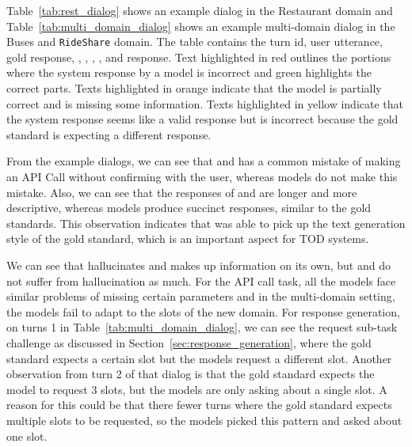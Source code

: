 
Table~\ref{tab:rest_dialog} shows an example dialog in the Restaurant domain and Table~\ref{tab:multi_domain_dialog} shows an example multi-domain dialog in the Buses and \texttt{RideShare} domain. The table contains the turn id, user utterance, gold response, {\gptt}, {\gptf}, {\gpt}, {\flan}, and {\opt} response. Text highlighted in red outlines the portions where the system response by a model is incorrect and green highlights the correct parts. Texts highlighted in orange indicate that the model is partially correct and is missing some information. Texts highlighted in yellow indicate that the system response seems like a valid response but is incorrect because the gold standard is expecting a different response. 

From the example dialogs, we can see that {\gptt} and {\gptf} has a common mistake of making an API Call without confirming with the user, whereas {\oursys} models do not make this mistake. Also, we can see that the responses of {\gptt} and {\gptf} are longer and more descriptive, whereas {\oursys} models produce succinct responses, similar to the gold standards. This observation indicates that {\oursys} was able to pick up the text generation style of the gold standard, which is an important aspect for TOD systems.

We can see that {\gpt} hallucinates and makes up information on its own, but {\flan} and {\opt} do not suffer from hallucination as much. For the API call task, all the models face similar problems of missing certain parameters and in the multi-domain setting, the models fail to adapt to the slots of the new domain. For response generation, on turns 1 in Table~\ref{tab:multi_domain_dialog}, we can see the request sub-task challenge as discussed in Section~\ref{sec:response_generation}, where the gold standard expects a certain slot but the models request a different slot. Another observation from turn 2 of that dialog is that the gold standard expects the model to request 3 slots, but the {\oursys} models are only asking about a single slot. A reason for this could be that there fewer turns where the gold standard expects multiple slots to be requested, so the models picked this pattern and asked about one slot.

